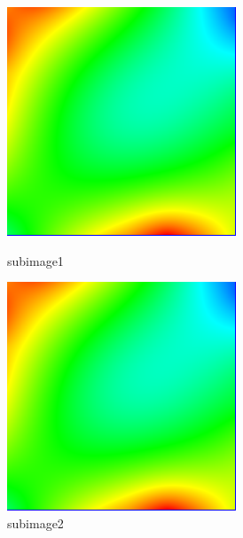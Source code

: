 \documentclass[a4paper,12pt]{article}
\begin{document}
\begin{figure}[ht!]
    \centering
    \begin{minipage}{0.30\linewidth}
        \centering
        \includegraphics[width=\linewidth]{img/eg.png}
        \caption{subimage1}
        \label{fig:subimage1}
    \end{minipage}
    \begin{minipage}{0.30\linewidth}
        \centering
        \includegraphics[width=\linewidth]{img/eg.png}
        \caption{subimage2}
        \label{fig:subimage2}
    \end{minipage}
\end{figure}
\end{document}
